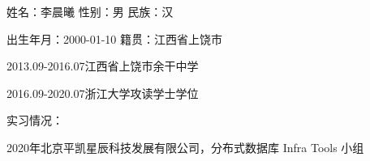 
姓名：李晨曦 \quad 性别：男 \quad 民族：汉

出生年月：2000-01-10 \quad 籍贯：江西省上饶市

2013.09-2016.07\quad 江西省上饶市余干中学

2016.09-2020.07\quad 浙江大学攻读学士学位


实习情况：

2020年\quad 北京平凯星辰科技发展有限公司，分布式数据库 Infra Tools 小组
